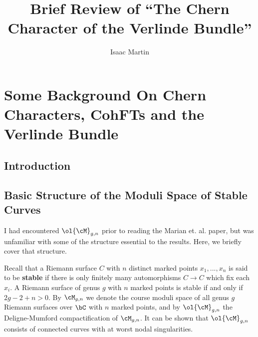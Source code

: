 \documentclass[raggedright, nofonts, notitlepage, openany, debug]{tufte-book}
\begin{document}
\newpage
\title{Brief Review of ``The Chern Character of the Verlinde Bundle''}
\author{Isaac Martin}
\maketitle
\chapter{Some Background On Chern Characters, CohFTs and the Verlinde Bundle}
\section{Introduction}
\section{Basic Structure of the Moduli Space of Stable Curves}
I had encountered $\ol{\cM}_{g,n}$ prior to reading the Marian et. al. paper, but was unfamiliar with some of the structure essential to the results. Here, we briefly cover that structure.

Recall that a Riemann surface $C$  with $n$ distinct marked points $x_1,...,x_n$ is said to be \textbf{stable} if there is only finitely many automorphisms $C\to C$ which fix each $x_i$. A Riemann surface of genus $g$ with $n$ marked points is stable if and only if $2g - 2 + n > 0$.  By $\cM_{g,n}$ we denote the course moduli space of all genus $g$ Riemann surfaces over $\bC$ with $n$ marked points, and by $\ol{\cM}_{g,n}$ the Deligne-Mumford compactification of $\cM_{g,n}$. It can be shown that $\ol{\cM}_{g,n}$ consists of connected curves with at worst nodal singularities. 
\end{document}
